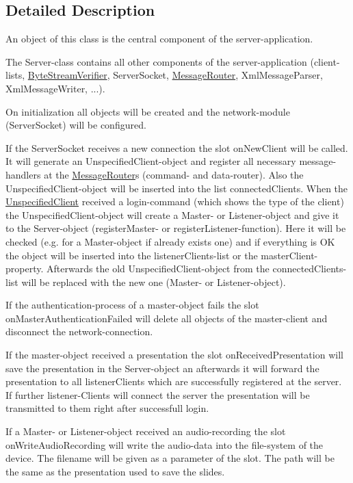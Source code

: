 \subsection{Detailed Description}
An object of this class is the central component of the server-\/application. 

The Server-\/class contains all other components of the server-\/application (client-\/lists, \hyperlink{class_server_appl_1_1_byte_stream_verifier}{Byte\+Stream\+Verifier}, Server\+Socket, \hyperlink{class_server_appl_1_1_message_router}{Message\+Router}, Xml\+Message\+Parser, Xml\+Message\+Writer, ...).

On initialization all objects will be created and the network-\/module (Server\+Socket) will be configured.

If the Server\+Socket receives a new connection the slot on\+New\+Client will be called. It will generate an Unspecified\+Client-\/object and register all necessary message-\/handlers at the \hyperlink{class_server_appl_1_1_message_router}{Message\+Router}\textquotesingle{}s (command-\/ and data-\/router). Also the Unspecified\+Client-\/object will be inserted into the list connected\+Clients. When the \hyperlink{class_server_appl_1_1_unspecified_client}{Unspecified\+Client} received a login-\/command (which shows the type of the client) the Unspecified\+Client-\/object will create a Master-\/ or Listener-\/object and give it to the Server-\/object (register\+Master-\/ or register\+Listener-\/function). Here it will be checked (e.\+g. for a Master-\/object if already exists one) and if everything is O\+K the object will be inserted into the listener\+Clients-\/list or the master\+Client-\/property. Afterwards the old Unspecified\+Client-\/object from the connected\+Clients-\/list will be replaced with the new one (Master-\/ or Listener-\/object).

If the authentication-\/process of a master-\/object fails the slot on\+Master\+Authentication\+Failed will delete all objects of the master-\/client and disconnect the network-\/connection.

If the master-\/object received a presentation the slot on\+Received\+Presentation will save the presentation in the Server-\/object an afterwards it will forward the presentation to all listener\+Clients which are successfully registered at the server. If further listener-\/\+Clients will connect the server the presentation will be transmitted to them right after successfull login.

If a Master-\/ or Listener-\/object received an audio-\/recording the slot on\+Write\+Audio\+Recording will write the audio-\/data into the file-\/system of the device. The filename will be given as a parameter of the slot. The path will be the same as the presentation used to save the slides. 

